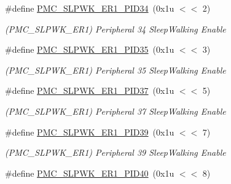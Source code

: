 \begin{DoxyCompactItemize}
\mbox{\label{group__SAME70__PMC_ga57cf107ae4124dc8bc11b3e62133e557}} 
\#define \mbox{\hyperlink{group__SAME70__PMC_ga57cf107ae4124dc8bc11b3e62133e557}{P\+M\+C\+\_\+\+S\+L\+P\+W\+K\+\_\+\+E\+R1\+\_\+\+P\+I\+D34}}~(0x1u $<$$<$ 2)
\begin{DoxyCompactList}\small\item\em (P\+M\+C\+\_\+\+S\+L\+P\+W\+K\+\_\+\+E\+R1) Peripheral 34 Sleep\+Walking Enable \end{DoxyCompactList}\item 
\mbox{\label{group__SAME70__PMC_gac123c4d2d4b85497660215a4691910cf}} 
\#define \mbox{\hyperlink{group__SAME70__PMC_gac123c4d2d4b85497660215a4691910cf}{P\+M\+C\+\_\+\+S\+L\+P\+W\+K\+\_\+\+E\+R1\+\_\+\+P\+I\+D35}}~(0x1u $<$$<$ 3)
\begin{DoxyCompactList}\small\item\em (P\+M\+C\+\_\+\+S\+L\+P\+W\+K\+\_\+\+E\+R1) Peripheral 35 Sleep\+Walking Enable \end{DoxyCompactList}\item 
\mbox{\label{group__SAME70__PMC_ga69f970e7ea026d4b22a1ca182c755bb8}} 
\#define \mbox{\hyperlink{group__SAME70__PMC_ga69f970e7ea026d4b22a1ca182c755bb8}{P\+M\+C\+\_\+\+S\+L\+P\+W\+K\+\_\+\+E\+R1\+\_\+\+P\+I\+D37}}~(0x1u $<$$<$ 5)
\begin{DoxyCompactList}\small\item\em (P\+M\+C\+\_\+\+S\+L\+P\+W\+K\+\_\+\+E\+R1) Peripheral 37 Sleep\+Walking Enable \end{DoxyCompactList}\item 
\mbox{\label{group__SAME70__PMC_gaf0e4fb57be2f5ebbe3e27183a3ed8c40}} 
\#define \mbox{\hyperlink{group__SAME70__PMC_gaf0e4fb57be2f5ebbe3e27183a3ed8c40}{P\+M\+C\+\_\+\+S\+L\+P\+W\+K\+\_\+\+E\+R1\+\_\+\+P\+I\+D39}}~(0x1u $<$$<$ 7)
\begin{DoxyCompactList}\small\item\em (P\+M\+C\+\_\+\+S\+L\+P\+W\+K\+\_\+\+E\+R1) Peripheral 39 Sleep\+Walking Enable \end{DoxyCompactList}\item 
\mbox{\label{group__SAME70__PMC_gabef08907d93b2e1f0bc8706673cf5075}} 
\#define \mbox{\hyperlink{group__SAME70__PMC_gabef08907d93b2e1f0bc8706673cf5075}{P\+M\+C\+\_\+\+S\+L\+P\+W\+K\+\_\+\+E\+R1\+\_\+\+P\+I\+D40}}~(0x1u $<$$<$ 8)
$$
\end{DoxyCompactItemize}
